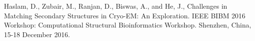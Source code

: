 \begin{cventries}
  \cventryr
    {}
    {}
    {}
    {}
    {
    Haslam, D., Zubair, M., Ranjan, D., Biswas, A., and He, J., Challenges in Matching Secondary Structures in Cryo-EM: An Exploration. IEEE BIBM 2016 Workshop: Computational Structural Bioinformatics Workshop. Shenzhen, China, 15-18 December 2016.
    }
\end{cventries}
